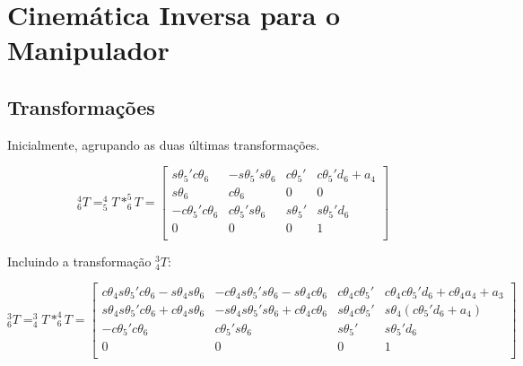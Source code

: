 \chapter{Cinemática Inversa para o Manipulador}
\label{Anexo-CinInv}


\section{Transformações}
\label{AnexoJacobiana-Transformacoes}

Inicialmente, agrupando as duas últimas transformações.

\begin{equation}
    ^4_6T = ^4_5T*^5_6T =   \begin{bmatrix}
                                s\theta_5'c\theta_6 & -s\theta_5's\theta_6 & c\theta_5' & c\theta_5'd_6 + a_4 \\
                                s\theta_6 & c\theta_6 & 0 & 0 \\
                                -c\theta_5'c\theta_6 & c\theta_5's\theta_6 & s\theta_5' & s\theta_5'd_6 \\
                                0 & 0 & 0 & 1 \\
                            \end{bmatrix}
\end{equation}

Incluindo a transformação $^3_4T$:

\begin{equation}
    ^3_6T = ^3_4T*^4_6T =   \begin{bmatrix}
                                c\theta_4s\theta_5'c\theta_6 - s\theta_4s\theta_6 & -c\theta_4s\theta_5's\theta_6 - s\theta_4c\theta_6 & c\theta_4c\theta_5' & c\theta_4c\theta_5'd_6 + c\theta_4a_4 + a_3 \\
                                s\theta_4s\theta_5'c\theta_6 + c\theta_4s\theta_6 & -s\theta_4s\theta_5's\theta_6 + c\theta_4c\theta_6 & s\theta_4c\theta_5' & s\theta_4(c\theta_5'd_6 + a_4) \\
                                -c\theta_5'c\theta_6 & c\theta_5's\theta_6 & s\theta_5' & s\theta_5'd_6 \\
                                0 & 0 & 0 & 1 \\
                            \end{bmatrix}
\end{equation}

